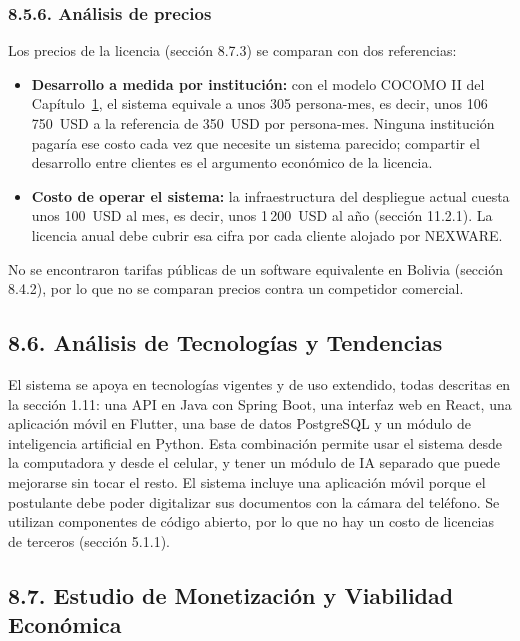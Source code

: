 \subsubsection{8.5.6. Análisis de precios}

Los precios de la licencia (sección 8.7.3) se comparan con dos referencias:

\begin{itemize}
    \item \textbf{Desarrollo a medida por institución:} con el modelo COCOMO II del Capítulo~\hyperref[cap:paps]{1}, el sistema equivale a unos 305 persona-mes, es decir, unos 106\,750~USD a la referencia de 350~USD por persona-mes. Ninguna institución pagaría ese costo cada vez que necesite un sistema parecido; compartir el desarrollo entre clientes es el argumento económico de la licencia.
    \item \textbf{Costo de operar el sistema:} la infraestructura del despliegue actual cuesta unos 100~USD al mes, es decir, unos 1\,200~USD al año (sección 11.2.1). La licencia anual debe cubrir esa cifra por cada cliente alojado por NEXWARE.
\end{itemize}

No se encontraron tarifas públicas de un software equivalente en Bolivia (sección 8.4.2), por lo que no se comparan precios contra un competidor comercial.

\subsection{8.6. Análisis de Tecnologías y Tendencias}

El sistema se apoya en tecnologías vigentes y de uso extendido, todas descritas en la sección 1.11: una API en Java con Spring Boot, una interfaz web en React, una aplicación móvil en Flutter, una base de datos PostgreSQL y un módulo de inteligencia artificial en Python. Esta combinación permite usar el sistema desde la computadora y desde el celular, y tener un módulo de IA separado que puede mejorarse sin tocar el resto. El sistema incluye una aplicación móvil porque el postulante debe poder digitalizar sus documentos con la cámara del teléfono. Se utilizan componentes de código abierto, por lo que no hay un costo de licencias de terceros (sección 5.1.1).

\subsection{8.7. Estudio de Monetización y Viabilidad Económica}

